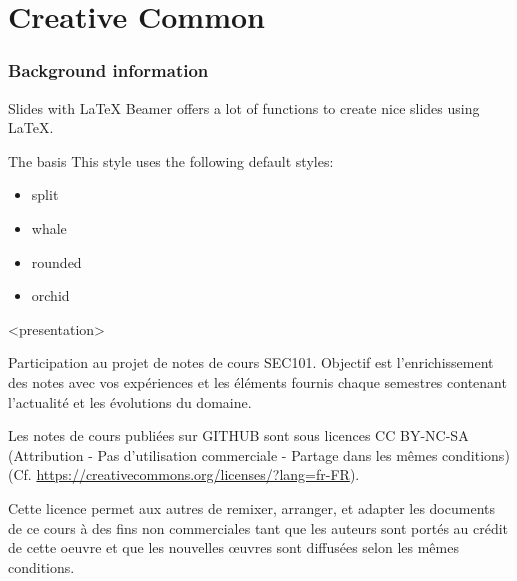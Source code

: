 

%
%
%
%
%


\section{Creative Common}

\begin{frame}
  \frametitle{Background information}

  \begin{block}{Slides with \LaTeX}
    Beamer offers a lot of functions to create nice slides using \LaTeX.
  \end{block}

  \begin{block}{The basis}
    This style uses the following default styles:
    \begin{itemize}
      \item split
      \item whale
      \item rounded
      \item orchid
    \end{itemize}
  \end{block}
\end{frame}

\begin{frame}<presentation>

Participation au projet de notes de cours SEC101. Objectif est l'enrichissement des notes avec vos expériences et les éléments fournis chaque semestres contenant l'actualité et les évolutions du domaine.

\end{frame}

\begin{frame}

	
Les notes de cours publiées sur GITHUB sont sous licences CC BY-NC-SA (Attribution - Pas d’utilisation commerciale - Partage dans les mêmes conditions)(Cf. \url{https://creativecommons.org/licenses/?lang=fr-FR}).

Cette licence permet aux autres de remixer, arranger, et adapter les documents de ce cours à des fins non commerciales tant que les auteurs sont portés au crédit de cette oeuvre et que les nouvelles œuvres sont diffusées selon les mêmes conditions.

\end{frame}

